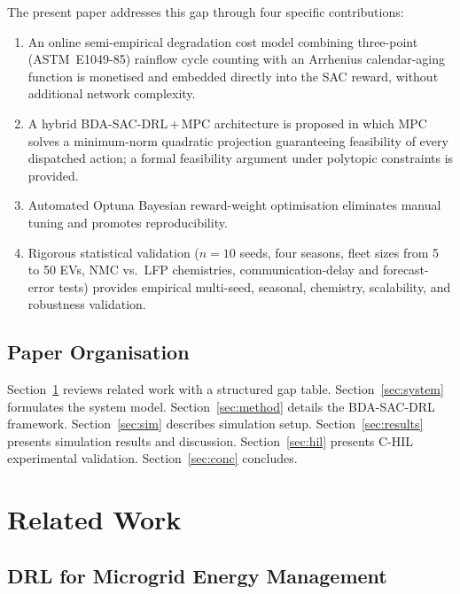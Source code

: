 \documentclass[journal,10pt,twocolumn]{IEEEtran}
\begin{document}
The present paper addresses this gap through four specific contributions:
\begin{enumerate}
\item An online semi-empirical degradation cost model combining
  three-point (ASTM~E1049-85) rainflow cycle counting with an
  Arrhenius calendar-aging function is monetised and embedded
  directly into the SAC reward, without additional network complexity.

\item A hybrid BDA-SAC-DRL\,+\,MPC architecture is proposed in which
  MPC solves a minimum-norm quadratic projection guaranteeing feasibility
  of every dispatched action; a formal feasibility argument under
  polytopic constraints is provided.

\item Automated Optuna Bayesian reward-weight optimisation eliminates
  manual tuning and promotes reproducibility.

\item Rigorous statistical validation ($n=10$ seeds, four seasons,
  fleet sizes from 5 to 50 EVs, NMC vs.\ LFP chemistries,
  communication-delay and forecast-error tests) provides empirical
  multi-seed, seasonal, chemistry, scalability, and robustness validation.
\end{enumerate}

\subsection{Paper Organisation}

Section~\ref{sec:related} reviews related work with a structured gap
table. Section~\ref{sec:system} formulates the system model.
Section~\ref{sec:method} details the BDA-SAC-DRL framework.
Section~\ref{sec:sim} describes simulation setup.
Section~\ref{sec:results} presents simulation results and discussion.
Section~\ref{sec:hil} presents C-HIL experimental validation.
Section~\ref{sec:conc} concludes.

\section{Related Work}\label{sec:related}

\subsection{DRL for Microgrid Energy Management}
\end{document}

